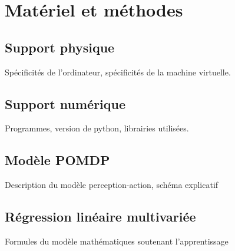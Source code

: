 
\chapter{Matériel et méthodes} %
\label{Materiel_methode} %


\section{Support physique}

Spécificités de l'ordinateur, spécificités de la machine virtuelle.\\


\section{Support numérique}

Programmes, version de python, librairies utilisées.\\


\section{Modèle POMDP}

Description du modèle perception-action, schéma explicatif


\section{Régression linéaire multivariée}

Formules du modèle mathématiques soutenant l'apprentissage